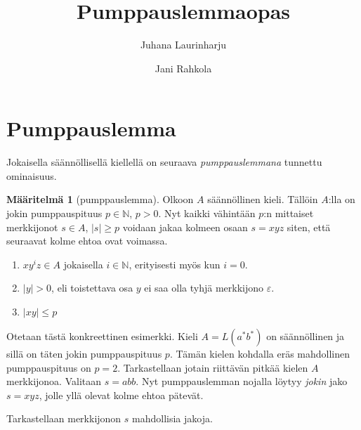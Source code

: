 \documentclass[a4paper,11pt]{article}
\title{Pumppauslemmaopas}
\author{Juhana Laurinharju \and Jani Rahkola}
\theoremstyle{definition}
\newtheorem*{definition}{Määritelmä}
\newcommand{\Nat}{\mathbb{N}}
\begin{document}
\maketitle

\section*{Pumppauslemma}

Jokaisella säännöllisellä kiellellä on seuraava \emph{pumppauslemmana} tunnettu
ominaisuus.

\begin{definition}[pumppauslemma]
    Olkoon $A$ säännöllinen kieli. Tällöin $A$:lla on jokin
    pumppauspituus $p \in \Nat$, $p > 0$. Nyt kaikki vähintään $p$:n
    mittaiset merkkijonot $s \in A$, $|s| \geq p$ voidaan jakaa
    kolmeen osaan $s = xyz$ siten, että seuraavat kolme ehtoa ovat
    voimassa.

    \begin{enumerate}
        \item
          $xy^iz \in A$ jokaisella $i \in \Nat$, erityisesti myös kun
          $i = 0$.
        \item
          $|y| > 0$, eli toistettava osa $y$ ei saa olla tyhjä
          merkkijono $\varepsilon$.
        \item
          $|xy| \leq p$
    \end{enumerate}
\end{definition}

Otetaan tästä konkreettinen esimerkki. Kieli $A = L(a^*b^*)$ on säännöllinen ja
sillä on täten jokin pumppauspituus $p$. Tämän kielen kohdalla eräs mahdollinen
pumppauspituus on $p = 2$. Tarkastellaan jotain riittävän pitkää kielen $A$
merkkijonoa. Valitaan $s = abb$. Nyt pumppauslemman nojalla löytyy \emph{jokin}
jako $s = xyz$, jolle yllä olevat kolme ehtoa pätevät.

Tarkastellaan merkkijonon $s$ mahdollisia jakoja.
\end{document}

